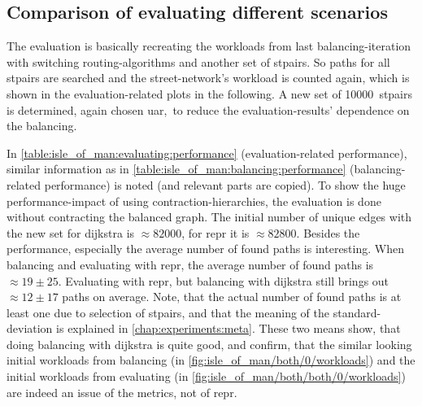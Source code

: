     \subsection{Comparison of evaluating different scenarios}
    \label{chap:experiments:isle_of_man:eval}

        The evaluation is basically recreating the workloads from last \gls{balancing}-iteration with switching routing-algorithms and another set of \glspl{stpair}.
        So paths for all \glspl{stpair} are searched and the street-network's workload is counted again, which is shown in the evaluation-related plots in the following.
        A new set of \num{10000}~\glspl{stpair} is determined, again chosen \gls{uar},\ to reduce the evaluation-results' dependence on the \gls{balancing}.

        In \vref{table:isle_of_man:evaluating:performance} (evaluation-related performance), similar information as in \vref{table:isle_of_man:balancing:performance} (\gls{balancing}-related performance) is noted (and relevant parts are copied).
        To show the huge performance-impact of using \gls{contraction-hierarchies}, the evaluation is done without contracting the balanced graph.
        The initial number of unique edges with the new set for \gls{dijkstra} is $\approx \num{82000}$, for \gls{repr} it is $\approx \num{82800}$.
        Besides the performance, especially the average number of found paths is interesting.
        When \gls{balancing} and evaluating with \gls{repr}, the average number of found paths is $\approx 19 \pm 25$.
        Evaluating with \gls{repr}, but \gls{balancing} with \gls{dijkstra} still brings out $\approx 12 \pm 17$ paths on average.
        Note, that the actual number of found paths is at least one due to selection of \glspl{stpair}, and that the meaning of the standard-deviation is explained in \cref{chap:experiments:meta}.
        These two means show, that doing \gls{balancing} with \gls{dijkstra} is quite good, and confirm, that the similar looking initial workloads from \gls{balancing} (in \vref{fig:isle_of_man/both/0/workloads}) and the initial workloads from evaluating (in \vref{fig:isle_of_man/both/both/0/workloads}) are indeed an issue of the \glspl{metric}, not of \gls{repr}.

